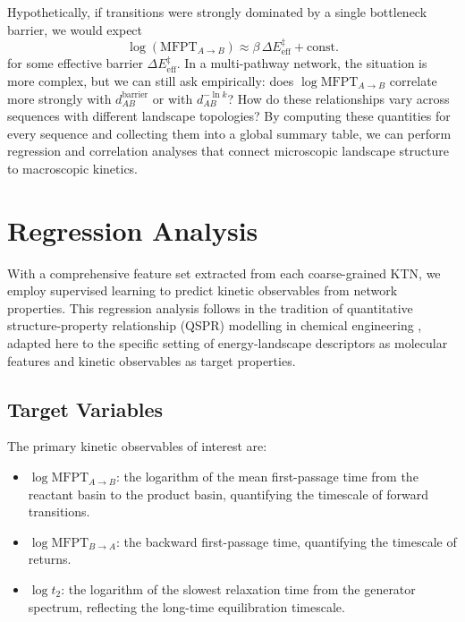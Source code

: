 Hypothetically, if transitions were strongly dominated by a single bottleneck barrier,
we would expect
\begin{equation}
  \log \left( \mathrm{MFPT}_{A\to B} \right)
  \approx \beta \,\Delta E^{\ddagger}_{\mathrm{eff}} + \text{const.}
\end{equation}
for some effective barrier $\Delta E^{\ddagger}_{\mathrm{eff}}$. In a multi-pathway
network, the situation is more complex, but we can still ask empirically: does
$\log \mathrm{MFPT}_{A\to B}$ correlate more strongly with
$d^{\mathrm{barrier}}_{AB}$ or with $d^{-\ln k}_{AB}$? How do these relationships
vary across sequences with different landscape topologies? By computing these
quantities for every sequence and collecting them into a global summary table, we can
perform regression and correlation analyses that connect microscopic landscape structure
to macroscopic kinetics.



\section{Regression Analysis}\label{sec:regression}

With a comprehensive feature set extracted from each coarse-grained KTN, we employ
supervised learning to predict kinetic observables from network properties. This
regression analysis follows in the tradition of quantitative structure-property
relationship (QSPR) modelling in chemical engineering
\cite{Cherkasov2014QSAR,Todeschini2000MolDescriptors,Venkatasubramanian2003QSPR},
adapted here to the specific setting of energy-landscape descriptors as molecular
features and kinetic observables as target properties.


\subsection{Target Variables}\label{subsec:targets}

The primary kinetic observables of interest are:

\begin{itemize}
  \item $\log \mathrm{MFPT}_{A \to B}$: the logarithm of the mean first-passage time
        from the reactant basin to the product basin, quantifying the timescale of
        forward transitions.
  \item $\log \mathrm{MFPT}_{B \to A}$: the backward first-passage time, quantifying
        the timescale of returns.
  \item $\log t_2$: the logarithm of the slowest relaxation time from the generator
        spectrum, reflecting the long-time equilibration timescale.
\end{itemize}

